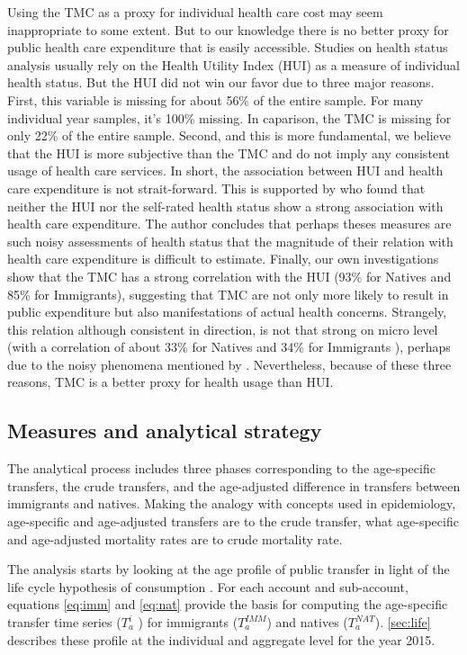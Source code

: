 \vspace{0.7em}\par
Using the TMC as a proxy for individual health care cost may seem inappropriate to some extent.
But to our knowledge there is no better proxy for public health care expenditure that is easily accessible.
Studies on health status analysis usually rely on the Health Utility Index (HUI) as a measure of individual health status.
But the HUI did not win our favor due to three major reasons.
First, this variable is missing for about 56\% of the entire sample.
For many individual year samples, it's 100\% missing.
In caparison, the TMC is missing for only 22\% of the entire sample.
Second, and this is more fundamental, we believe that the HUI is more subjective than the TMC and do not imply any consistent usage of health care services.
In short, the association between HUI and health care expenditure is not strait-forward.
This is supported by \citet{Pierard:2016ik} who found that neither the HUI nor the self-rated health status show a strong association with health care expenditure.
The author concludes that perhaps theses measures are such noisy assessments of health status that the magnitude of their relation with health care expenditure is difficult to estimate.
Finally, our own investigations show that the TMC has a strong correlation with the HUI (93\% for Natives and 85\% for Immigrants), suggesting that TMC are not only more likely to result in public expenditure but also manifestations of actual health concerns.
Strangely, this relation although consistent in direction, is not that strong on micro level (with a correlation of about 33\% for Natives and 34\% for Immigrants ), perhaps due to the noisy phenomena mentioned by \citet{Pierard:2016ik}.
Nevertheless, because of these three reasons, TMC is a better proxy for health usage than HUI.

\subsection{Measures and analytical strategy}

The analytical process includes three phases corresponding to the age-specific transfers, the crude transfers, and the age-adjusted difference in transfers between immigrants and natives.
Making the analogy with concepts used in epidemiology, age-specific and age-adjusted transfers are to the crude transfer, what age-specific and age-adjusted mortality rates are to crude mortality rate.

\vspace{0.7em}\par
The analysis starts by looking at the age profile of public transfer in light of the life cycle hypothesis of consumption \citep{Ando:1963ea,Deaton:2005vr}.
For each account and sub-account, equations \eqref{eq:imm} and \eqref{eq:nat} provide the basis for computing the age-specific transfer time series (\( T^{i}_a \) ) for immigrants (\(T^{IMM}_a\)) and natives (\( T^{NAT}_a \)). \autoref{sec:life} describes these profile at the individual and aggregate level for the year 2015.

